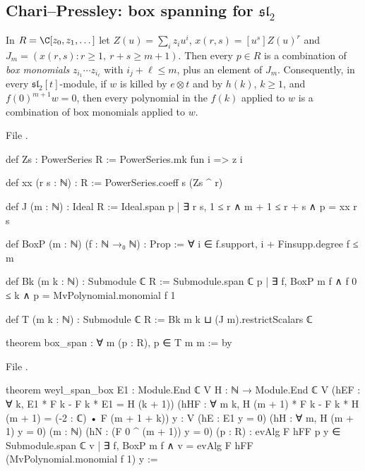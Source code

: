 \subsection{Chari--Pressley: box spanning for $\mathfrak{sl}_2$}

\begin{theorem}\label{l26:thm:box}
In $R=\C[z_0,z_1,\dots]$ let $Z(u)=\sum_iz_iu^i$, $x(r,s)=[u^s]Z(u)^r$ and $J_m=(x(r,s):r\ge1,\ r+s\ge m+1)$. Then every
$p\in R$ is a combination of \emph{box monomials} $z_{i_1}\cdots z_{i_\ell}$ with $i_j+\ell\le m$, plus an element of $J_m$.
Consequently, in every $\mathfrak{sl}_2[t]$-module, if $w$ is killed by $e\otimes t$ and by $h(k)$, $k\ge1$, and
$f(0)^{m+1}w=0$, then every polynomial in the $f(k)$ applied to $w$ is a combination of box monomials applied to $w$.
\end{theorem}
\noindent File .
\begin{leancode}
def Zs : PowerSeries R := PowerSeries.mk fun i => z i

def xx (r s : ℕ) : R := PowerSeries.coeff s (Zs ^ r)

def J (m : ℕ) : Ideal R := Ideal.span {p | ∃ r s, 1 ≤ r ∧ m + 1 ≤ r + s ∧ p = xx r s}

def BoxP (m : ℕ) (f : ℕ →₀ ℕ) : Prop := ∀ i ∈ f.support, i + Finsupp.degree f ≤ m

def Bk (m k : ℕ) : Submodule ℂ R :=
  Submodule.span ℂ {p | ∃ f, BoxP m f ∧ f 0 ≤ k ∧ p = MvPolynomial.monomial f 1}

def T (m k : ℕ) : Submodule ℂ R := Bk m k ⊔ (J m).restrictScalars ℂ

theorem box_span : ∀ m (p : R), p ∈ T m m := by
\end{leancode}
\noindent File .
\begin{leancode}
theorem weyl_span_box {E1 : Module.End ℂ V} {H : ℕ → Module.End ℂ V}
    (hEF : ∀ k, E1 * F k - F k * E1 = H (k + 1))
    (hHF : ∀ m k, H (m + 1) * F k - F k * H (m + 1) = (-2 : ℂ) • F (m + 1 + k))
    {y : V} (hE : E1 y = 0) (hH : ∀ m, H (m + 1) y = 0) (m : ℕ) (hN : (F 0 ^ (m + 1)) y = 0)
    (p : R) :
    evAlg F hFF p y ∈
      Submodule.span ℂ {v | ∃ f, BoxP m f ∧ v = evAlg F hFF (MvPolynomial.monomial f 1) y} :=
\end{leancode}

